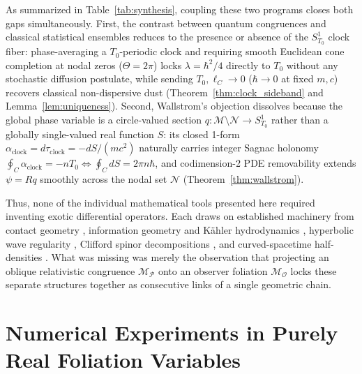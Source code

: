 \documentclass[11pt, a4paper]{article}
\theoremstyle{definition}
\begin{document}
As summarized in Table~\ref{tab:synthesis}, coupling these two programs closes both gaps simultaneously. First, the contrast between quantum congruences and classical statistical ensembles reduces to the presence or absence of the $S^1_{T_0}$ clock fiber: phase-averaging a $T_0$-periodic clock and requiring smooth Euclidean cone completion at nodal zeros ($\Theta = 2\pi$) locks $\lambda = \hbar^2/4$ directly to $T_0$ without any stochastic diffusion postulate, while sending $T_0, \ell_C \to 0$ ($\hbar \to 0$ at fixed $m, c$) recovers classical non-dispersive dust (Theorem~\ref{thm:clock_sideband} and Lemma~\ref{lem:uniqueness}). Second, Wallstrom's objection \cite{Wallstrom1994, Schmelzer2011} dissolves because the global phase variable is a circle-valued section $q: \mathcal{M}\setminus\mathcal{N} \to S^1_{T_0}$ rather than a globally single-valued real function $S$: its closed 1-form $\alpha_{\text{clock}} = d\tau_{\text{clock}} = -dS/(mc^2)$ naturally carries integer Sagnac holonomy $\oint_C \alpha_{\text{clock}} = -n T_0 \iff \oint_C dS = 2\pi n\hbar$, and codimension-2 PDE removability extends $\psi = Rq$ smoothly across the nodal set $\mathcal{N}$ (Theorem~\ref{thm:wallstrom}).

Thus, none of the individual mathematical tools presented here required inventing exotic differential operators. Each draws on established machinery from contact geometry \cite{Gromov1985}, information geometry and K\"{a}hler hydrodynamics \cite{Stam1959, Cencov1982, Reginatto1999, HallReginatto2002, Khesin2018, Khesin2026}, hyperbolic wave regularity \cite{BarGinouxPfaffle2007, Bar2015}, Clifford spinor decompositions \cite{Takabayasi1952, Hestenes1990}, and curved-spacetime half-densities \cite{DeWitt1957}. What was missing was merely the observation that projecting an oblique relativistic congruence $\mathcal{M}_{\mathcal{P}}$ onto an observer foliation $\mathcal{M}_{\mathcal{O}}$ locks these separate structures together as consecutive links of a single geometric chain.

\section{\texorpdfstring{Numerical Experiments in Purely Real Foliation Variables}{Numerical Experiments in Purely Real Foliation Variables}}
\label{sec:numerical_simulations}
\end{document}
